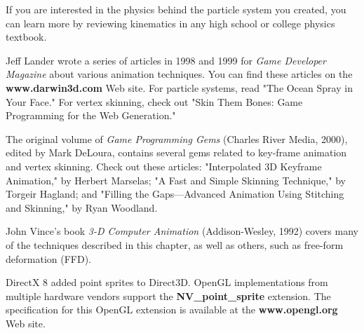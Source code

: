 \documentclass[../main.tex]{subfiles}
\begin{document}
If you are interested in the physics behind the particle system you created, you can learn more by reviewing kinematics in any high school or college physics textbook.

Jeff Lander wrote a series of articles in 1998 and 1999 for \textit{Game Developer Magazine} about various animation techniques. You can find these articles on the \textbf{www.darwin3d.com} Web site. For particle systems, read "The Ocean Spray in Your Face." For vertex skinning, check out "Skin Them Bones: Game Programming for the Web Generation."

The original volume of \textit{Game Programming Gems} (Charles River Media, 2000), edited by Mark DeLoura, contains several gems related to key-frame animation and vertex skinning. Check out these articles: "Interpolated 3D Keyframe Animation," by Herbert Marselas; "A Fast and Simple Skinning Technique," by Torgeir Hagland; and "Filling the Gaps—Advanced Animation Using Stitching and Skinning," by Ryan Woodland.

John Vince's book \textit{3-D Computer Animation} (Addison-Wesley, 1992) covers many of the techniques described in this chapter, as well as others, such as free-form deformation (FFD).

DirectX 8 added point sprites to Direct3D. OpenGL implementations from multiple hardware vendors support the \textbf{NV_point_sprite} extension. The specification for this OpenGL extension is available at the \textbf{www.opengl.org} Web site.
\end{document}

